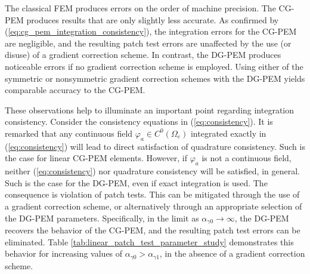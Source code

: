 The classical FEM produces errors on the order of machine precision. The CG-PEM produces results that are only slightly less accurate. As confirmed by (\ref{eq:cg_pem_integration_consistency}), the integration errors for the CG-PEM are negligible, and the resulting patch test errors are unaffected by the use (or disuse) of a gradient correction scheme. In contrast, the DG-PEM produces noticeable errors if no gradient correction scheme is employed. Using either of the symmetric or nonsymmetric gradient correction schemes with the DG-PEM yields comparable accuracy to the CG-PEM.

These observations help to illuminate an important point regarding integration consistency. Consider the consistency equations in (\ref{eq:consistency}). It is remarked that any continuous field $\varphi_a \in C^0 (\Omega_e)$ integrated exactly in (\ref{eq:consistency}) will lead to direct satisfaction of quadrature consistency. Such is the case for linear CG-PEM elements. However, if $\varphi_a$ is not a continuous field, neither (\ref{eq:consistency}) nor quadrature consistency will be satisfied, in general. Such is the case for the DG-PEM, even if exact integration is used. The consequence is violation of patch tests. This can be mitigated through the use of a gradient correction scheme, or alternatively through an appropriate selection of the DG-PEM parameters. Specifically, in the limit as $\alpha_{\gamma0} \rightarrow \infty$, the DG-PEM recovers the behavior of the CG-PEM, and the resulting patch test errors can be eliminated. Table \ref{tab:linear_patch_test_parameter_study} demonstrates this behavior for increasing values of $\alpha_{\gamma0} > \alpha_{\gamma1}$, in the absence of a gradient correction scheme.

